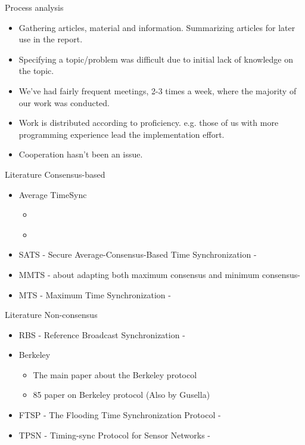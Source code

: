 \documentclass{beamer}
\begin{document}
\begin{frame}{Process analysis}
    \begin{itemize}
        \item Gathering articles, material and information. Summarizing articles for later use in the report.
        \item Specifying a topic/problem was difficult due to initial lack of knowledge on the topic. 
        \item We've had fairly frequent meetings, 2-3 times a week, where the majority of our work was conducted. 
        \item Work is distributed according to proficiency. 
        e.g. those of us with more programming experience lead the implementation effort.
        \item Cooperation hasn't been an issue.
    \end{itemize}
\end{frame}

\begin{frame}{Literature}
    Consensus-based
    
        \begin{itemize}
            \item Average TimeSync
                \begin{itemize}
                \item \cite{SchenatoGamba07}
                    \item \cite{LucaFiorentin11}
                \end{itemize}
            \item SATS - Secure Average-Consensus-Based Time Synchronization - \cite{HeChengShiChen13}
            \item MMTS - about adapting both maximum consensus and minimum consensus- \cite{HeLiChenCheng13}
            \item MTS - Maximum Time Synchronization - \cite{HeChengShiChen14}
        \end{itemize}
\end{frame}

\begin{frame}{Literature}
    Non-consensus
    
        \begin{itemize}
        \item  RBS - Reference Broadcast Synchronization - \cite{ElsonGirodEstrin02}
        \item Berkeley
          \begin{itemize}
          \item \cite{Gusella89} The main paper about the Berkeley protocol
          \item \cite{GusellaZatti85} 85 paper on Berkeley protocol (Also by Gusella)
          \end{itemize}
        \item FTSP - The Flooding Time Synchronization Protocol - \cite{Maroti04} 
        \item TPSN - Timing-sync Protocol for Sensor Networks - \cite{GaneriwalKumarSrivastava03}
    \end{itemize}

\end{frame}
 
\end{document}
